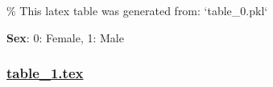 \documentclass[11pt]{article}
\begin{document}
\begin{codeoutput}
\% This latex table was generated from: `table\_0.pkl`
\begin{table}[h]
\caption{Descriptive statistics of sex, age, height, and weight stratified by sex.}
\label{table:DescriptiveStatistics}
\begin{threeparttable}
\renewcommand{\TPTminimum}{\linewidth}
\begin{tablenotes}
\footnotesize
\item \textbf{Sex}: 0: Female, 1: Male
\end{tablenotes}
\end{threeparttable}
\end{table}
\end{codeoutput}

\subsubsection*{\hyperlink{code-LaTeX Table Design-table-1-tex}{table\_1.tex}}
\end{document}
